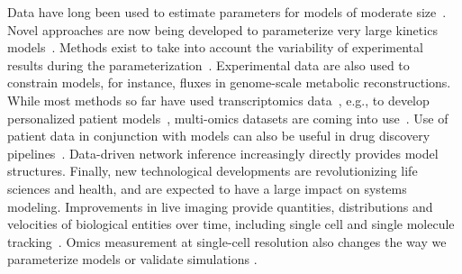 \documentclass[]{draft-sbml-paper}
\begin{document}
Data have long been used to estimate parameters for models of moderate size~\citep{mendes1998non}. Novel approaches are now being developed to parameterize very large kinetics models~\citep{Villaverde2018}. Methods exist to take into account the variability of experimental results during the parameterization~\citep{liepe2010abc}. Experimental data are also used to constrain models, for instance, fluxes in genome-scale metabolic reconstructions. While most methods so far have used transcriptomics data~\citep{machado2014systematic}, e.g., to develop personalized patient models~\citep{uhlen2017pathology}, multi-omics datasets are coming into use~\citep{ebrahim2016multi}. Use of patient data in conjunction with models can also be useful in drug discovery pipelines~\citep{Jerby2012}. Data-driven network inference increasingly directly provides model structures. Finally, new technological developments are revolutionizing life sciences and health, and are expected to have a large impact on systems modeling. Improvements in live imaging provide quantities, distributions and velocities of biological entities over time, including single cell and single molecule tracking~\citep{lipkow2008model, griffin2011regulation}. Omics measurement at single-cell resolution also changes the way we parameterize models or validate simulations \citep{Karr2012a, OBrien2013, Goelzer945, Yang2018}.
\end{document}
